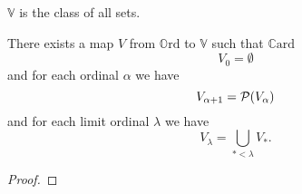 \documentclass[../set-theory.tex]{subfiles}
\begin{document}
  \begin{forthel}
    \begin{definition}
      $\mathbb{V}$ is the class of all sets.
    \end{definition}
  \end{forthel}

  \begin{forthel}
    \begin{proposition}
      There exists a map $V$ from $\mathbb{O}\mathrm{rd}$ to $\mathbb{V}$ such that
      $\mathbb{C}\mathrm{ard}$
      \[ V_{0} = \emptyset \]
      and for each ordinal $\alpha$ we have
      \[ V_{\alpha + 1} = \mathcal{P}(V_{\alpha}) \]
      and for each limit ordinal $\lambda$ we have
      \[ V_{\lambda} = \bigcup_{* < \lambda} V_{*}. \]
    \end{proposition}
    \begin{proof}
    \end{proof}
  \end{forthel}
\end{document}
